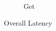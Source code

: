 \begin{figure}[t]
\begin{subfigure}{0.45\textwidth}
      \caption{Get}
      \label{fig:eval_giza_get}
    \end{subfigure}
  \caption{\name Overall Latency}
  \label{fig:geo_tpcc}
\end{figure}

